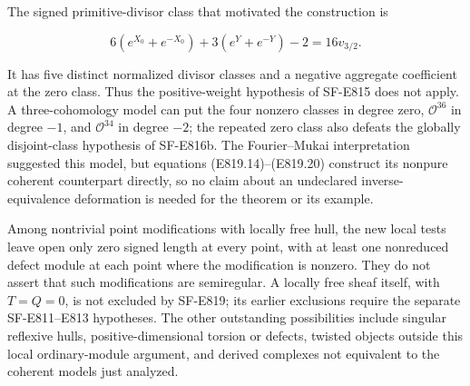The signed primitive-divisor class that motivated the construction is

\[
 6(e^{X_0}+e^{-X_0})+3(e^Y+e^{-Y})-2
        =16v_{3/2}.
 \tag{E819.21}
\]

It has five distinct normalized divisor classes and a negative aggregate
coefficient at the zero class. Thus the positive-weight hypothesis of
SF-E815 does not apply. A three-cohomology model can put the four
nonzero classes in degree zero, \(\mathcal O^{36}\) in degree \(-1\),
and \(\mathcal O^{34}\) in degree \(-2\); the repeated zero class also
defeats the globally disjoint-class hypothesis of SF-E816b. The
Fourier--Mukai interpretation suggested this model, but equations
(E819.14)--(E819.20) construct its nonpure coherent counterpart
directly, so no claim about an undeclared inverse-equivalence
deformation is needed for the theorem or its example.

Among nontrivial point modifications with locally free hull, the new
local tests leave open only zero signed length at every point, with at
least one nonreduced defect module at each point where the modification
is nonzero. They do not assert that such modifications are semiregular.
A locally free sheaf itself, with \(T=Q=0\), is not excluded by SF-E819;
its earlier exclusions require the separate SF-E811--E813 hypotheses.
The other outstanding possibilities include singular reflexive hulls,
positive-dimensional torsion or defects, twisted objects outside this
local ordinary-module argument, and derived complexes not equivalent to
the coherent models just analyzed.
